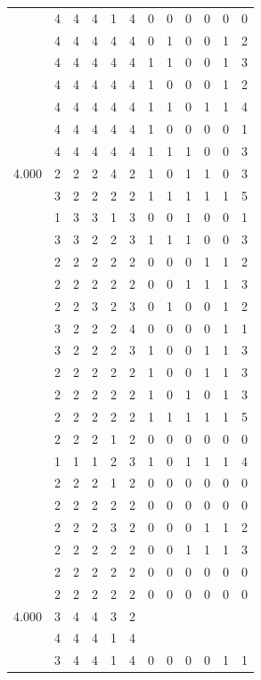\documentclass[]{book}
\theoremstyle{definition}
\theoremstyle{definition}
\theoremstyle{definition}
\theoremstyle{remark}
\begin{document}
\begin{table}
{\begin{tabular}[t]{rrrrrrrrrrrr}
 & 4 & 4 & 4 & 1 & 4 & 0 & 0 & 0 & 0 & 0 & 0\\
 & 4 & 4 & 4 & 4 & 4 & 0 & 1 & 0 & 0 & 1 & 2\\
 & 4 & 4 & 4 & 4 & 4 & 1 & 1 & 0 & 0 & 1 & 3\\
 & 4 & 4 & 4 & 4 & 4 & 1 & 0 & 0 & 0 & 1 & 2\\
 & 4 & 4 & 4 & 4 & 4 & 1 & 1 & 0 & 1 & 1 & 4\\
 & 4 & 4 & 4 & 4 & 4 & 1 & 0 & 0 & 0 & 0 & 1\\
 & 4 & 4 & 4 & 4 & 4 & 1 & 1 & 1 & 0 & 0 & 3\\
4.000 & 2 & 2 & 2 & 4 & 2 & 1 & 0 & 1 & 1 & 0 & 3\\
 & 3 & 2 & 2 & 2 & 2 & 1 & 1 & 1 & 1 & 1 & 5\\
 & 1 & 3 & 3 & 1 & 3 & 0 & 0 & 1 & 0 & 0 & 1\\
 & 3 & 3 & 2 & 2 & 3 & 1 & 1 & 1 & 0 & 0 & 3\\
 & 2 & 2 & 2 & 2 & 2 & 0 & 0 & 0 & 1 & 1 & 2\\
 & 2 & 2 & 2 & 2 & 2 & 0 & 0 & 1 & 1 & 1 & 3\\
 & 2 & 2 & 3 & 2 & 3 & 0 & 1 & 0 & 0 & 1 & 2\\
 & 3 & 2 & 2 & 2 & 4 & 0 & 0 & 0 & 0 & 1 & 1\\
 & 3 & 2 & 2 & 2 & 3 & 1 & 0 & 0 & 1 & 1 & 3\\
 & 2 & 2 & 2 & 2 & 2 & 1 & 0 & 0 & 1 & 1 & 3\\
 & 2 & 2 & 2 & 2 & 2 & 1 & 0 & 1 & 0 & 1 & 3\\
 & 2 & 2 & 2 & 2 & 2 & 1 & 1 & 1 & 1 & 1 & 5\\
 & 2 & 2 & 2 & 1 & 2 & 0 & 0 & 0 & 0 & 0 & 0\\
 & 1 & 1 & 1 & 2 & 3 & 1 & 0 & 1 & 1 & 1 & 4\\
 & 2 & 2 & 2 & 1 & 2 & 0 & 0 & 0 & 0 & 0 & 0\\
 & 2 & 2 & 2 & 2 & 2 & 0 & 0 & 0 & 0 & 0 & 0\\
 & 2 & 2 & 2 & 3 & 2 & 0 & 0 & 0 & 1 & 1 & 2\\
 & 2 & 2 & 2 & 2 & 2 & 0 & 0 & 1 & 1 & 1 & 3\\
 & 2 & 2 & 2 & 2 & 2 & 0 & 0 & 0 & 0 & 0 & 0\\
 & 2 & 2 & 2 & 2 & 2 & 0 & 0 & 0 & 0 & 0 & 0\\
4.000 & 3 & 4 & 4 & 3 & 2 &  &  &  &  &  & \\
 & 4 & 4 & 4 & 1 & 4 &  &  &  &  &  & \\
 & 3 & 4 & 4 & 1 & 4 & 0 & 0 & 0 & 0 & 1 & 1\\

\end{tabular}}
\end{table}
\end{document}
